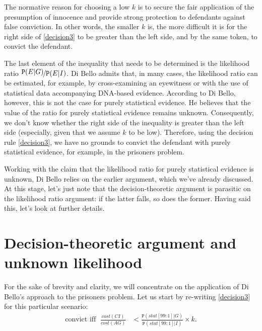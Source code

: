 \documentclass{article}
\newcommand{\pr}[1]{\mbox{$\mathtt{P}(#1)$}}
\begin{document}
	\noindent The normative reason for choosing a  low $k$ is to secure the fair application of the presumption of innocence and provide strong protection to defendants against false conviction. In other words, the smaller $k$ is, the more difficult it is for the right side of  \eqref{decision3} to be greater than the left side,  and by the same token, to convict the  defendant. 
	
	The last element of the inequality that needs to be determined is the likelihood ratio $\nicefrac{\pr{E\vert G}}{\pr{E\vert I}}$. Di Bello admits that, in many cases, the likelihood ratio can be estimated, for example, by cross-examining an eyewitness or with the use of statistical data accompanying DNA-based evidence. According to Di Bello, however, this  is not the case for purely statistical evidence. He believes that the value of the ratio for purely statistical evidence remains unknown. Consequently, we don't know whether the right side of the inequality is greater than the left side (especially, given that we assume $k$ to be  low). Therefore, using the decision rule \eqref{decision3}, we have no grounds  to convict the defendant with purely statistical evidence, for example, in the prisoners problem. 
	
	
	
	Working with the claim that the likelihood ratio for  purely statistical evidence is unknown, Di Bello relies on the earlier argument, which we've already discussed. At this stage, let's just note that the decision-theoretic argument is parasitic on the likelihood ratio argument: if the latter falls, so does the former. Having said this, let's look at further details.






 \section{Decision-theoretic argument and unknown likelihood} \label{sec:deci_fails}
 

For the sake of brevity and clarity, we will concentrate on the application of Di Bello's approach to the prisoners problem. Let us start by re-writing  \eqref{decision3} for this particular scenario:
\begin{align}\label{decision4}
\text{convict iff}\;\,\,\frac{cost(CI)}{cost(AG)}&<\frac{\pr{stat[99:1]\vert G}}{\pr{stat[99:1]\vert I}}\times k.
\end{align}	
\end{document}
